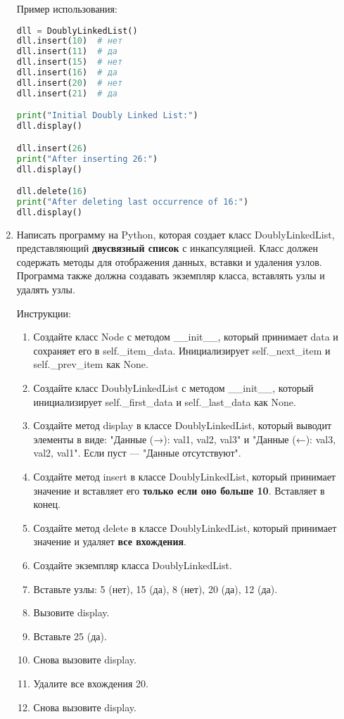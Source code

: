\begin{enumerate}
Пример использования:
\begin{lstlisting}[language=Python]
dll = DoublyLinkedList()
dll.insert(10)  # нет
dll.insert(11)  # да
dll.insert(15)  # нет
dll.insert(16)  # да
dll.insert(20)  # нет
dll.insert(21)  # да

print("Initial Doubly Linked List:")
dll.display()

dll.insert(26)
print("After inserting 26:")
dll.display()

dll.delete(16)
print("After deleting last occurrence of 16:")
dll.display()
\end{lstlisting}

\item Написать программу на Python, которая создает класс DoublyLinkedList, представляющий \textbf{двусвязный список} с инкапсуляцией. Класс должен содержать методы для отображения данных, вставки и удаления узлов. Программа также должна создавать экземпляр класса, вставлять узлы и удалять узлы.

Инструкции:
\begin{enumerate}
    \item Создайте класс Node с методом \_\_init\_\_, который принимает data и сохраняет его в self.\_item\_data. Инициализирует self.\_next\_item и self.\_prev\_item как None.
    \item Создайте класс DoublyLinkedList с методом \_\_init\_\_, который инициализирует self.\_first\_data и self.\_last\_data как None.
    \item Создайте метод display в классе DoublyLinkedList, который выводит элементы в виде: "Данные (→): val1, val2, val3" и "Данные (←): val3, val2, val1". Если пуст — "Данные отсутствуют".
    \item Создайте метод insert в классе DoublyLinkedList, который принимает значение и вставляет его \textbf{только если оно больше 10}. Вставляет в конец.
    \item Создайте метод delete в классе DoublyLinkedList, который принимает значение и удаляет \textbf{все вхождения}.
    \item Создайте экземпляр класса DoublyLinkedList.
    \item Вставьте узлы: 5 (нет), 15 (да), 8 (нет), 20 (да), 12 (да).
    \item Вызовите display.
    \item Вставьте 25 (да).
    \item Снова вызовите display.
    \item Удалите все вхождения 20.
    \item Снова вызовите display.
\end{enumerate}


\end{enumerate}
